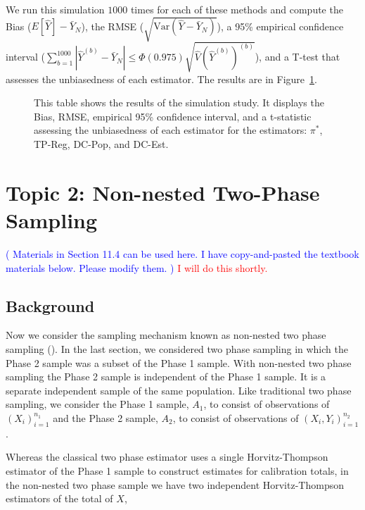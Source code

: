 \documentclass[12pt]{article}
\newcommand{\Var}{{\text{Var}}}
\begin{document}
We run this simulation $1000$ times for each of these methods and compute the
Bias ($E[\hat Y] - \bar Y_N$), the RMSE ($\sqrt{\Var(\hat Y - \bar Y_N)}$), a 95\%
empirical confidence interval ($\sum_{b = 1}^{1000} |\hat Y^{(b)} - \bar Y_N| \leq 
\Phi(0.975)\sqrt{\hat V(\hat Y^{(b)})^{(b)}}$), and a T-test that assesses the
unbiasedness of each estimator. The results are in Figure~\ref{fig:tpdc-mean}.

\begin{figure}[ht!]
  \centering

\caption{This table shows the results of the simulation study. It displays the
Bias, RMSE, empirical 95\% confidence interval, and a t-statistic assessing the
unbiasedness of each estimator for the estimators: $\pi^*$, TP-Reg, DC-Pop, and
DC-Est.}
\label{fig:tpdc-mean}
\end{figure}

\section{Topic 2: Non-nested Two-Phase Sampling}

\textcolor{blue}{
( Materials in Section 11.4 can be used here. I have copy-and-pasted the
textbook materials below. Please modify them.  )
}
\textcolor{red}{I will do this shortly.}

\subsection{Background}

Now we consider the sampling mechanism known as non-nested two phase sampling 
(\cite{kim2024statistics}). In the last section, we considered two phase sampling
in which the Phase 2 sample was a subset of the Phase 1 sample. With non-nested
two phase sampling the Phase 2 sample is independent of the Phase 1 sample. It
is a separate independent sample of the same population. Like traditional two
phase sampling, we consider the Phase 1 sample, $A_1$, to consist of
observations of $(X_i)_{i = 1}^{n_1}$ and the Phase 2 sample, $A_2$, to consist
of observations of $(X_i, Y_i)_{i = 1}^{n_2}$. 

Whereas the classical two phase estimator uses a single Horvitz-Thompson
estimator of the Phase 1 sample to construct estimates for calibration totals,
in the non-nested two phase sample we have two independent Horvitz-Thompson
estimators of the total of $X$,
\end{document}
